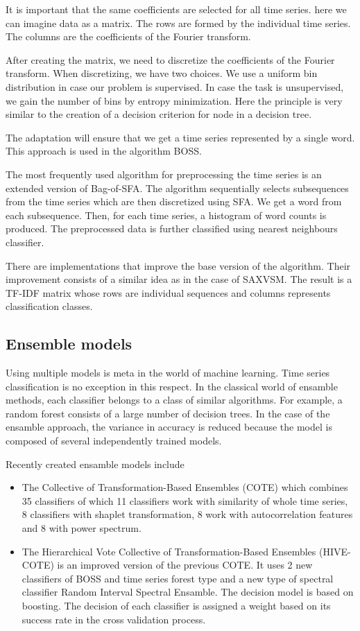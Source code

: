 \documentclass[thesis=M,english]{FITthesis}[2019/12/23]
\begin{document}
It is important that the same coefficients are selected for all time series. here we can imagine data as a matrix. The rows are formed by the individual time series. The columns are the coefficients of the Fourier transform.

After creating the matrix, we need to discretize the coefficients of the Fourier transform. When discretizing, we have two choices. We use a uniform bin distribution in case our problem is supervised. In case the task is unsupervised, we gain the number of bins by entropy minimization. Here the principle is very similar to the creation of a decision criterion for node in a decision tree.

The adaptation will ensure that we get a time series represented by a single word. This approach is used in the \cite{BOSS} algorithm BOSS.

The most frequently used algorithm for preprocessing the time series is an extended version of Bag-of-SFA. The algorithm sequentially selects subsequences from the time series which are then discretized using SFA. We get a word from each subsequence. Then, for each time series, a histogram of word counts is produced. The preprocessed data is further classified using nearest neighbours classifier.

There are implementations that improve the base version of the algorithm. Their improvement consists of a similar idea as in the case of SAXVSM. The result is a TF-IDF matrix whose rows are individual sequences and columns represents classification classes.

\subsection{Ensemble models}
Using multiple models is meta in the world of machine learning. Time series classification is no exception in this respect. In the classical world of ensamble methods, each classifier belongs to a class of similar algorithms. For example, a random forest consists of a large number of decision trees.
In the case of the ensamble approach, the variance in accuracy is reduced because the model is composed of several independently trained models.

Recently created ensamble models include
\begin{itemize}
		\item The Collective of Transformation-Based Ensembles (COTE) which combines 35 classifiers of which 11 classifiers work with similarity of whole time series, 8 classifiers with shaplet transformation, 8 work with autocorrelation features and 8 with power spectrum.
		\item The Hierarchical Vote Collective of Transformation-Based Ensembles (HIVE-COTE) is an improved version of the previous COTE. It uses 2 new classifiers of BOSS and time series forest type and a new type of spectral classifier Random Interval Spectral Ensamble. The decision model is based on boosting. The decision of each classifier is assigned a weight based on its success rate in the cross validation process.
	\end{itemize}
\end{document}
